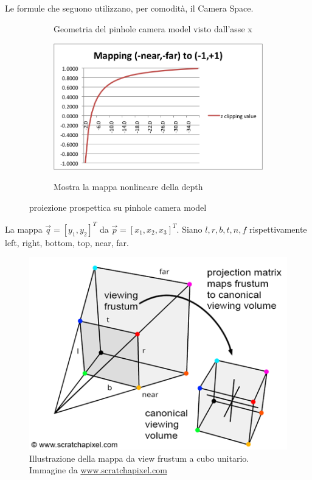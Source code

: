 Le formule che seguono utilizzano, per comodit\`a, il Camera Space.\par
\begin{figure}[tb]
	\begin{subfigure}{0.5\linewidth}
		
		\label{chapter2:camera:pinhole:pinhole_projected}
		\caption{Geometria del pinhole camera model visto dall'asse x}
	\end{subfigure}
	\begin{subfigure}{0.5\linewidth}
		\includegraphics[width=\linewidth, trim=4px 4px 100px 40px, clip]{../assets/chapter2_camera_non_linear_mapping_learnwebgl.png}
		\label{chapter2:camera:pinhole:learnWebGLzremap}
		\caption{Mostra la mappa nonlineare della depth\footnotemark{}}
	\end{subfigure}
	\caption{proiezione prospettica su pinhole camera model}
	\label{chapter2:camera:pinhole}
\end{figure}
La mappa $\vec{q}=[y_1,y_2]^T$ da $\vec{p}=[x_1,x_2,x_3]^T$. Siano $l,r,b,t,n,f$ rispettivamente left, right, bottom, top, near, far.\par
\begin{figure}[tb]
	\centering
	\includegraphics[width=0.6\linewidth]{../assets/chapter2_view_frustum.png}
	\caption{Illustrazione della mappa da view frustum a cubo unitario. Immagine da \href{www.scratchapixel.com}{www.scratchapixel.com}}
	\label{chapter2:camera:viewFrustum}
\end{figure}
